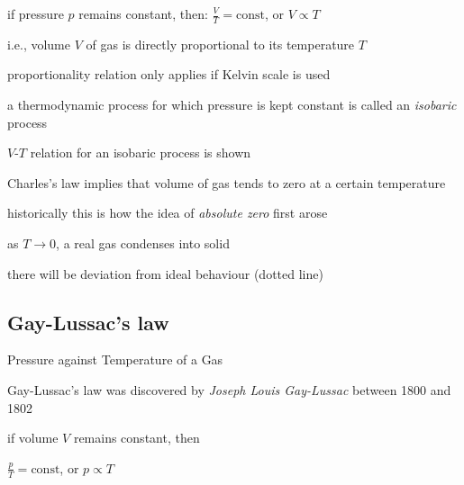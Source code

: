 if pressure $p$ remains constant, then: $\boxed{\frac{V}{T}=\text{const}}$, or $\boxed{V \propto T}$

i.e., volume $V$ of gas is directly proportional to its temperature $T$

\cmt proportionality relation only applies if Kelvin scale is used

\cmt a thermodynamic process for which pressure is kept constant is called an \emph{isobaric} process

$V$-$T$ relation for an isobaric process is shown

\cmt Charles's law implies that volume of gas tends to zero at a certain temperature

historically this is how the idea of \emph{absolute zero} first arose

\cmt as $T\to0$, a real gas condenses into solid

there will be deviation from ideal behaviour (dotted line)



\subsection*{Gay-Lussac's law}

\begin{marginfigure}
		\caption{Pressure against Temperature of a Gas}
\end{marginfigure}

Gay-Lussac's law was discovered by \emph{Joseph Louis Gay-Lussac} between 1800 and 1802


if volume $V$ remains constant, then

{
	
	\centering
	
	$\boxed{\frac{p}{T}=\text{const}}$, or $\boxed{p \propto T}$
	
} 

